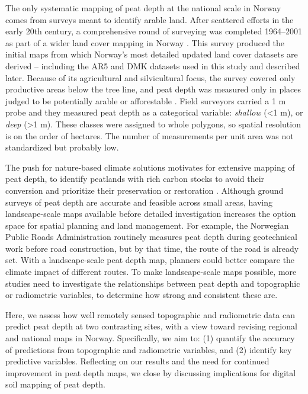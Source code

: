 \documentclass[soil, manuscript]{copernicus}
\begin{document}
The only systematic mapping of peat depth at the national scale in Norway comes from surveys meant to identify arable land.
After scattered efforts in the early 20th century, a comprehensive round of surveying was completed 1964--2001 as part of a wider land cover mapping in Norway \citep{bjordalMarkslagsklassifikasjonOkonomiskKartverk2007}.
This survey produced the initial maps from which Norway's most detailed updated land cover datasets are derived -- including the AR5 and DMK datasets used in this study and described later.
Because of its agricultural and silvicultural focus, the survey covered only productive areas below the tree line, and peat depth was measured only in places judged to be potentially arable or afforestable \citep{ahlstromAR5Klassifikasjonssystem2019}.
Field surveyors carried a 1 m probe and they measured peat depth as a categorical variable: \emph{shallow} (\textless1 m), or \emph{deep} (\textgreater1 m).
These classes were assigned to whole polygons, so spatial resolution is on the order of hectares.
The number of measurements per unit area was not standardized but probably low.

The push for nature-based climate solutions motivates for extensive mapping of peat depth, to identify peatlands with rich carbon stocks to avoid their conversion and prioritize their preservation or restoration \citep{strackPotentialPeatlandsNatureBased2022}.
Although ground surveys of peat depth are accurate and feasible across small areas, having landscape-scale maps available before detailed investigation increases the option space for spatial planning and land management.
For example, the Norwegian Public Roads Administration routinely measures peat depth during geotechnical work before road construction, but by that time, the route of the road is already set.
With a landscape-scale peat depth map, planners could better compare the climate impact of different routes.
To make landscape-scale maps possible, more studies need to investigate the relationships between peat depth and topographic or radiometric variables, to determine how strong and consistent these are.

Here, we assess how well remotely sensed topographic and radiometric data can predict peat depth at two contrasting sites, with a view toward revising regional and national maps in Norway.
Specifically, we aim to: (1) quantify the accuracy of predictions from topographic and radiometric variables, and (2) identify key predictive variables.
Reflecting on our results and the need for continued improvement in peat depth maps, we close by discussing implications for digital soil mapping of peat depth.
\end{document}
